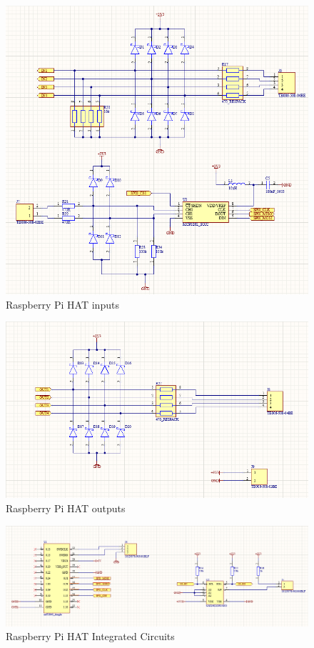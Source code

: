 \begin{figure}[!htb]
    \centering
    \includegraphics[width=\textwidth]{img/bemenetekrpihat.png}
    \caption{Raspberry Pi HAT inputs}
    \label{fig:borderrouterbemenetek}
\end{figure}
\begin{figure}[!htb]
    \centering
    \includegraphics[width=\textwidth]{img/kimenetekrpi.png}
    \caption{Raspberry Pi HAT outputs}
    \label{fig:borderrouterkimenetek}
\end{figure}
\begin{figure}[!htb]
    \centering
    \includegraphics[width=\textwidth]{img/eeprom.png}
    \caption{Raspberry Pi HAT Integrated Circuits}
    \label{fig:borderrouterick}
\end{figure}
